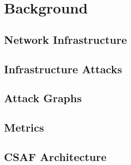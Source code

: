 \section{Background}\label{subsec:background:main}


\subsection{Network Infrastructure}\label{subsec:background:infra}


\subsection{Infrastructure Attacks}\label{subsec:background:infra_sec}


\subsection{Attack Graphs}\label{subsec:background:ag}


% 

\subsection{Metrics}\label{subsec:background:metrics}


\subsection{CSAF Architecture}\label{subsec:background:arch}

